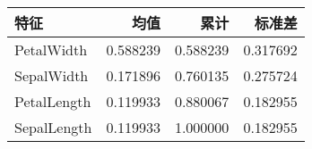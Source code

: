 \begin{tabular}{lrrr}
\hline
特征 &      均值 &        累计 &       标准差 \\
\hline
PetalWidth &  0.588239 &  0.588239 &  0.317692 \\
SepalWidth &  0.171896 &  0.760135 &  0.275724 \\
PetalLength &  0.119933 &  0.880067 &  0.182955 \\
SepalLength &  0.119933 &  1.000000 &  0.182955 \\
\hline
\end{tabular}
